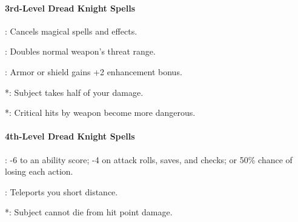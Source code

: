 \paragraph{3rd-Level Dread Knight Spells}
\begin{list}{}{\leftmargin=1em}
\item {}: Cancels magical spells and effects.
\item {}: Doubles normal weapon's threat range.
\item {}: Armor or shield gains +2 enhancement bonus.
\item {}*: Subject takes half of your damage.
\item {}*: Critical hits by weapon become more dangerous. %
\end{list}
\paragraph{4th-Level Dread Knight Spells}
\begin{list}{}{\leftmargin=1em}
\item {}: -6 to an ability score; -4 on attack rolls, saves, and checks; or 50\% chance of losing each action. %
\item {}: Teleports you short distance.
\item {}*: Subject cannot die from hit point damage.
\end{list}
